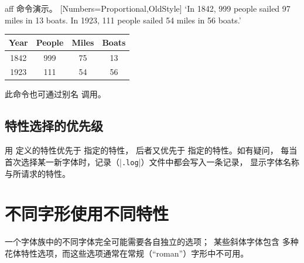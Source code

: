 \documentclass[a4paper]{l3doc}
\begin{document}
\begin{Lexample}{aff}{ 命令演示。}
           [Numbers={Proportional,OldStyle}]
  `In 1842, 999 people sailed 97 miles in
   13 boats. In 1923, 111 people sailed 54
   miles in 56 boats.'            \bigskip

  {
  \begin{tabular}{@{} cccc @{}}
            Year & People & Miles & Boats \\
    \hline  1842 &  999   &  75   &  13   \\
            1923 &  111   &  54   &  56
  \end{tabular}}
\end{Lexample}

\DescribeMacro{\addfontfeature}
此命令也可通过别名 \cmd{\addfontfeature} 调用。


\subsection{特性选择的优先级}
用  定义的特性优先于  指定的特性，
后者又优先于  指定的特性。如有疑问，
每当首次选择某一新字体时，记录（|\texttt{.log}|）文件中都会写入一条记录，
显示字体名称与所请求的特性。


\section{不同字形使用不同特性}
\label{sec:bfit-feat}


一个字体族中的不同字体完全可能需要各自独立的选项；\eg\ 某些斜体字体包含
多种花体特性选项，而这些选项通常在常规（“roman”）字形中不可用。
\end{document}
